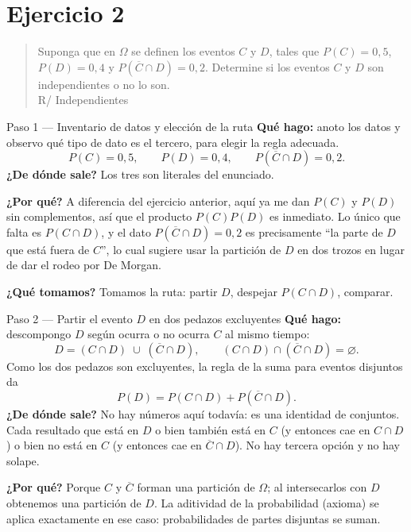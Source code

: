 \documentclass[11pt]{article}
\begin{document}
\section*{Ejercicio 2}

\begin{quote}
Suponga que en $\Omega$ se definen los eventos $C$ y $D$, tales que $P(C)=0{,}5$, $P(D)=0{,}4$ y $P(\overline{C}\cap D)=0{,}2$. Determine si los eventos $C$ y $D$ son independientes o no lo son.\\[2pt]
\hspace*{\fill}R/ Independientes
\end{quote}

\begin{sol}
\begin{paso}{Paso 1 --- Inventario de datos y elección de la ruta}
\textbf{Qué hago:} anoto los datos y observo qué tipo de dato es el tercero, para elegir la
regla adecuada.
\[
P(C)=0{,}5,\qquad P(D)=0{,}4,\qquad P(\overline{C}\cap D)=0{,}2.
\]
\textbf{¿De dónde sale?} Los tres son literales del enunciado.

\textbf{¿Por qué?} A diferencia del ejercicio anterior, aquí ya me dan $P(C)$ y $P(D)$ sin
complementos, así que el producto $P(C)P(D)$ es inmediato. Lo único que falta es
$P(C\cap D)$, y el dato $P(\overline{C}\cap D)=0{,}2$ es precisamente ``la parte de $D$ que
está fuera de $C$'', lo cual sugiere usar la partición de $D$ en dos trozos en lugar de dar
el rodeo por De Morgan.

\textbf{¿Qué tomamos?} Tomamos la ruta: partir $D$, despejar $P(C\cap D)$, comparar.
\end{paso}

\begin{paso}{Paso 2 --- Partir el evento $D$ en dos pedazos excluyentes}
\textbf{Qué hago:} descompongo $D$ según ocurra o no ocurra $C$ al mismo tiempo:
\[
D=(C\cap D)\;\cup\;(\overline{C}\cap D),
\qquad (C\cap D)\cap(\overline{C}\cap D)=\varnothing .
\]
Como los dos pedazos son excluyentes, la regla de la suma para eventos disjuntos da
\[
P(D)=P(C\cap D)+P(\overline{C}\cap D).
\]
\textbf{¿De dónde sale?} No hay números aquí todavía: es una identidad de conjuntos. Cada
resultado que está en $D$ o bien también está en $C$ (y entonces cae en $C\cap D$) o bien no
está en $C$ (y entonces cae en $\overline{C}\cap D$). No hay tercera opción y no hay solape.

\textbf{¿Por qué?} Porque $C$ y $\overline{C}$ forman una partición de $\Omega$; al
intersecarlos con $D$ obtenemos una partición de $D$. La aditividad de la probabilidad
(axioma) se aplica exactamente en ese caso: probabilidades de partes disjuntas se suman.


\end{paso}
\end{sol}
\end{document}
